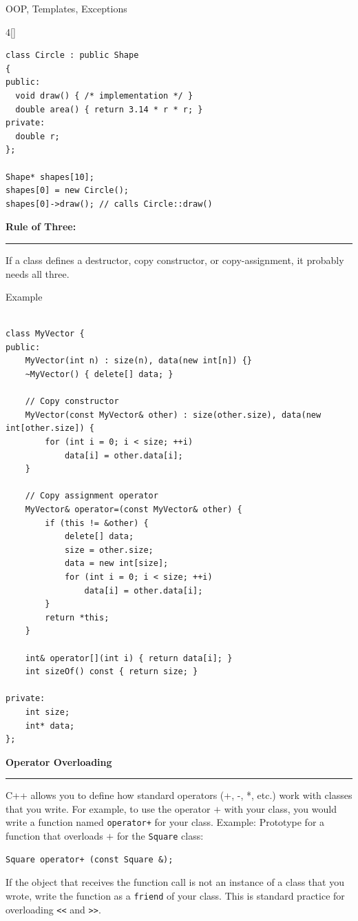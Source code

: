 \documentclass[final]{beamer}
\renewcommand{\subsection}[1]{%
  \par\vspace{1em}%
  {\noindent\large\bfseries #1\par}%
  \vspace{0.5em}\hrule\vspace{1em}%
}
\begin{document}
\begin{frame}[t,fragile]{OOP, Templates, Exceptions}
\begin{multicols}{4}[\setlength{\columnsep}{1.5cm}]
\begin{lstlisting}
class Circle : public Shape
{
public:
  void draw() { /* implementation */ }
  double area() { return 3.14 * r * r; }
private:
  double r;
};

Shape* shapes[10];
shapes[0] = new Circle();
shapes[0]->draw(); // calls Circle::draw()
\end{lstlisting}


\subsection{Rule of Three:} 
If a class defines a destructor, copy constructor, or copy-assignment, it probably needs all three. %

Example 
\begin{lstlisting}

class MyVector {
public:
    MyVector(int n) : size(n), data(new int[n]) {}
    ~MyVector() { delete[] data; }

    // Copy constructor
    MyVector(const MyVector& other) : size(other.size), data(new int[other.size]) {
        for (int i = 0; i < size; ++i)
            data[i] = other.data[i];
    }

    // Copy assignment operator
    MyVector& operator=(const MyVector& other) {
        if (this != &other) {
            delete[] data;
            size = other.size;
            data = new int[size];
            for (int i = 0; i < size; ++i)
                data[i] = other.data[i];
        }
        return *this;
    }

    int& operator[](int i) { return data[i]; }
    int sizeOf() const { return size; }

private:
    int size;
    int* data;
};
\end{lstlisting}

 \subsection{Operator Overloading}
C++ allows you to define how standard operators (+, -, *, etc.) work with classes that you write. For example, to use the operator $+$ with your class, you would write a function named \texttt{operator+} for your class.
Example:
Prototype for a function that overloads $+$ for the \texttt{Square} class:
\begin{lstlisting}
Square operator+ (const Square &);
\end{lstlisting}

If the object that receives the function call is not an instance of a class that you wrote,
 write the function as a \texttt{friend} of your class. This is standard practice for overloading \texttt{<<} and \texttt{>>}.







\end{multicols}
\end{frame}
\end{document}
